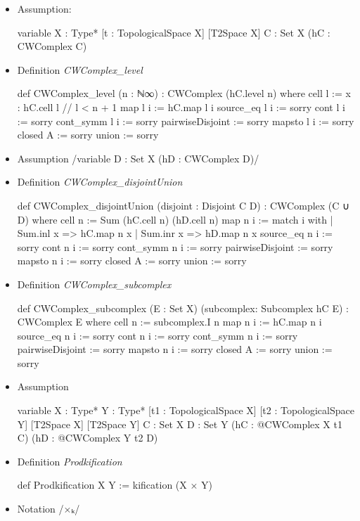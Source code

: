 \documentclass[colorinlistoftodos]{article}
\begin{document}
\begin{itemize}
  \item Assumption:
\begin{leancode}
variable {X : Type*} [t : TopologicalSpace X] [T2Space X] {C : Set X} (hC : CWComplex C)
\end{leancode}
  \item Definition \emph{CWComplex\_level}
\begin{leancode}
def CWComplex_level (n : ℕ∞) : CWComplex (hC.level n) where
  cell l := {x : hC.cell l // l < n + 1}
  map l i := hC.map l i
  source_eq l i := sorry
  cont l i := sorry
  cont_symm l i := sorry
  pairwiseDisjoint := sorry
  mapsto l i := sorry
  closed A := sorry
  union := sorry
\end{leancode}
  \item Assumption \lean /variable {D : Set X} (hD : CWComplex D)/
  \item Definition \emph{CWComplex\_disjointUnion}
\begin{leancode}
def CWComplex_disjointUnion (disjoint : Disjoint C D) : CWComplex (C ∪ D) where
  cell n := Sum (hC.cell n) (hD.cell n)
  map n i :=
    match i with
    | Sum.inl x => hC.map n x
    | Sum.inr x => hD.map n x
  source_eq n i := sorry
  cont n i := sorry
  cont_symm n i := sorry
  pairwiseDisjoint := sorry
  mapsto n i := sorry
  closed A := sorry
  union := sorry
\end{leancode}
  \item Definition \emph{CWComplex\_subcomplex} 
\begin{leancode}
def CWComplex_subcomplex (E : Set X) (subcomplex: Subcomplex hC E) : CWComplex E where
  cell n := subcomplex.I n
  map n i := hC.map n i
  source_eq n i := sorry
  cont n i := sorry
  cont_symm n i := sorry
  pairwiseDisjoint := sorry 
  mapsto n i := sorry
  closed A := sorry 
  union := sorry 
\end{leancode}
  \item Assumption 
\begin{leancode}
variable {X : Type*} {Y : Type*} [t1 : TopologicalSpace X] [t2 : TopologicalSpace Y]
[T2Space X] [T2Space Y] {C : Set X} {D : Set Y} (hC : @CWComplex X t1 C)
(hD : @CWComplex Y t2 D)
\end{leancode}
  \item Definition \emph{Prodkification}
\begin{leancode}
def Prodkification X Y := kification (X × Y)
\end{leancode}
  \item Notation \lean /×ₖ/

\end{itemize}
\end{document}
